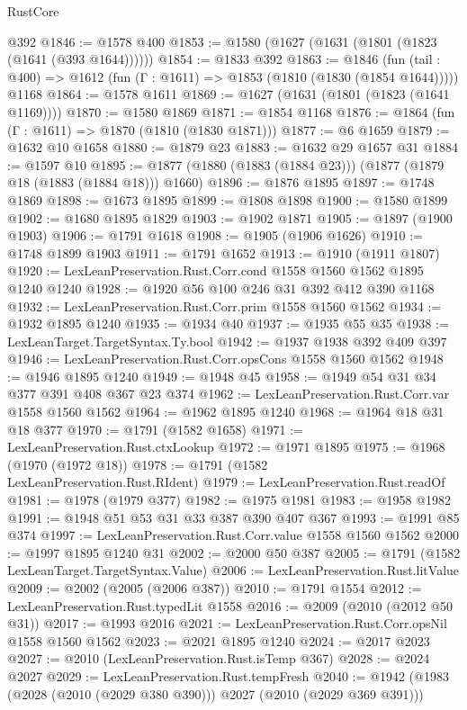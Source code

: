 \begin{lexlean}{RustCore}
\begin{coremodule}
    @392
@1846 := @1578 @400
@1853 := @1580 (@1627 (@1631 (@1801 (@1823 (@1641 (@393 @1644))))))
@1854 := @1833 @392
@1863 := @1846
    (fun (tail : @400) => @1612 (fun (Γ : @1611) => @1853 (@1810 (@1830 (@1854 @1644)))))
    @1168
@1864 := @1578 @1611
@1869 := @1627 (@1631 (@1801 (@1823 (@1641 @1169))))
@1870 := @1580 @1869
@1871 := @1854 @1168
@1876 := @1864 (fun (Γ : @1611) => @1870 (@1810 (@1830 @1871)))
@1877 := @6 @1659
@1879 := @1632 @10 @1658
@1880 := @1879 @23
@1883 := @1632 @29 @1657 @31
@1884 := @1597 @10
@1895 := @1877 (@1880 (@1883 (@1884 @23))) (@1877 (@1879 @18 (@1883 (@1884 @18))) @1660)
@1896 := @1876 @1895
@1897 := @1748 @1869
@1898 := @1673 @1895
@1899 := @1808 @1898
@1900 := @1580 @1899
@1902 := @1680 @1895 @1829
@1903 := @1902 @1871
@1905 := @1897 (@1900 @1903)
@1906 := @1791 @1618
@1908 := @1905 (@1906 @1626)
@1910 := @1748 @1899 @1903
@1911 := @1791 @1652
@1913 := @1910 (@1911 @1807)
@1920 := LexLeanPreservation.Rust.Corr.cond @1558 @1560 @1562 @1895 @1240 @1240
@1928 := @1920 @56 @100 @246 @31 @392 @412 @390 @1168
@1932 := LexLeanPreservation.Rust.Corr.prim @1558 @1560 @1562
@1934 := @1932 @1895 @1240
@1935 := @1934 @40
@1937 := @1935 @55 @35
@1938 := LexLeanTarget.TargetSyntax.Ty.bool
@1942 := @1937 @1938 @392 @409 @397
@1946 := LexLeanPreservation.Rust.Corr.opsCons @1558 @1560 @1562
@1948 := @1946 @1895 @1240
@1949 := @1948 @45
@1958 := @1949 @54 @31 @34 @377 @391 @408 @367 @23 @374
@1962 := LexLeanPreservation.Rust.Corr.var @1558 @1560 @1562
@1964 := @1962 @1895 @1240
@1968 := @1964 @18 @31 @18 @377
@1970 := @1791 (@1582 @1658)
@1971 := LexLeanPreservation.Rust.ctxLookup
@1972 := @1971 @1895
@1975 := @1968 (@1970 (@1972 @18))
@1978 := @1791 (@1582 LexLeanPreservation.Rust.RIdent)
@1979 := LexLeanPreservation.Rust.readOf
@1981 := @1978 (@1979 @377)
@1982 := @1975 @1981
@1983 := @1958 @1982
@1991 := @1948 @51 @53 @31 @33 @387 @390 @407 @367
@1993 := @1991 @85 @374
@1997 := LexLeanPreservation.Rust.Corr.value @1558 @1560 @1562
@2000 := @1997 @1895 @1240 @31
@2002 := @2000 @50 @387
@2005 := @1791 (@1582 LexLeanTarget.TargetSyntax.Value)
@2006 := LexLeanPreservation.Rust.litValue
@2009 := @2002 (@2005 (@2006 @387))
@2010 := @1791 @1554
@2012 := LexLeanPreservation.Rust.typedLit @1558
@2016 := @2009 (@2010 (@2012 @50 @31))
@2017 := @1993 @2016
@2021 := LexLeanPreservation.Rust.Corr.opsNil @1558 @1560 @1562
@2023 := @2021 @1895 @1240
@2024 := @2017 @2023
@2027 := @2010 (LexLeanPreservation.Rust.isTemp @367)
@2028 := @2024 @2027
@2029 := LexLeanPreservation.Rust.tempFresh
@2040 := @1942 (@1983 (@2028 (@2010 (@2029 @380 @390))) @2027 (@2010 (@2029 @369 @391)))

\end{coremodule}
\end{lexlean}
